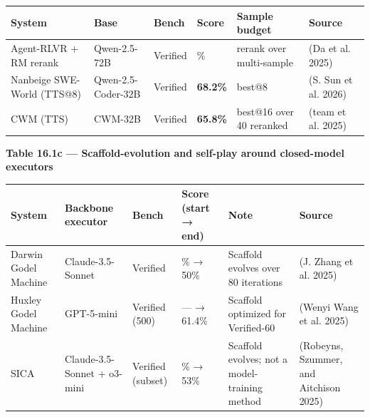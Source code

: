 \documentclass{article}
\begin{document}
\begin{longtable}[]{@{}
  >{\raggedright\arraybackslash}p{}
  >{\raggedright\arraybackslash}p{}
  >{\raggedright\arraybackslash}p{}
  >{\raggedright\arraybackslash}p{}
  >{\raggedright\arraybackslash}p{}
  >{\raggedright\arraybackslash}p{}@{}}
\toprule
System & Base & Bench & Score & Sample budget & Source \\
\midrule
\endhead
Agent-RLVR + RM rerank & Qwen-2.5-72B & Verified & 27.8\% & rerank over
multi-sample & (Da et al. 2025) \\
Nanbeige SWE-World (TTS@8) & Qwen-2.5-Coder-32B & Verified &
\textbf{68.2\%} & best@8 & (S. Sun et al. 2026) \\
CWM (TTS) & CWM-32B & Verified & \textbf{65.8\%} & best@16 over 40
reranked & (team et al. 2025) \\
\bottomrule
\end{longtable}

\textbf{Table 16.1c --- Scaffold-evolution and self-play around
closed-model executors}

\begin{longtable}[]{@{}
  >{\raggedright\arraybackslash}p{}
  >{\raggedright\arraybackslash}p{}
  >{\raggedright\arraybackslash}p{}
  >{\raggedright\arraybackslash}p{}
  >{\raggedright\arraybackslash}p{}
  >{\raggedright\arraybackslash}p{}@{}}
\toprule
System & Backbone executor & Bench & Score (start → end) & Note &
Source \\
\midrule
\endhead
Darwin Godel Machine & Claude-3.5-Sonnet & Verified & 20\% → 50\% &
Scaffold evolves over 80 iterations & (J. Zhang et al. 2025) \\
Huxley Godel Machine & GPT-5-mini & Verified (500) & --- → 61.4\% &
Scaffold optimized for Verified-60 & (Wenyi Wang et al. 2025) \\
SICA & Claude-3.5-Sonnet + o3-mini & Verified (subset) & 17\% → 53\% &
Scaffold evolves; not a model-training method & (Robeyns, Szummer, and
Aitchison 2025) \\
\bottomrule
\end{longtable}
\end{document}
